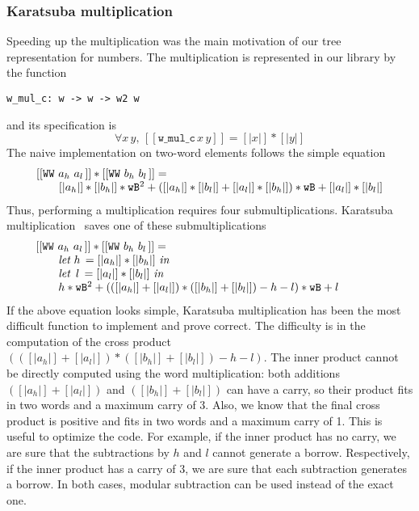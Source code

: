\subsubsection{Karatsuba multiplication}
Speeding up the multiplication was the main motivation of our 
tree representation for numbers. The multiplication is represented in our library
by the function
\begin{verbatim}
w_mul_c: w -> w -> w2 w
\end{verbatim}
and its specification is
$$\forall x\, y,\, [[\texttt{w\_mul\_c}\, x\, y]] = [|x|] * [|y|]$$
The naive implementation on two-word elements follows the simple equation
$$\begin{array}{l}
[[\texttt{WW}\,\,a_h\,\,a_l\,]] * [[\texttt{WW}\,\,b_h\,\,b_l\,]] =\\
\hskip20pt [|{a_h}|] * [|{b_h}|] * {\texttt{wB}} ^ 2 +  ([|{a_h}|] * [|{b_l}|] + [|{a_l}|] * [|{b_h}|]) * {\texttt{wB}} + [|{a_l}|] * [|{b_l}|]
\end{array}
$$
Thus, performing a multiplication requires four submultiplications.
Karatsuba multiplication~\cite{Karat} saves one of these submultiplications
$$\begin{array}{l}
[[\texttt{WW}\,\,a_h\,\,a_l\,]] * [[\texttt{WW}\,\,b_h\,\,b_l\,]] = \\
\hskip20pt \textit{let}\,\, {h}\, = [|{a_h}|] * [|{b_h}|]\,\, \textit{in}\\
\hskip20pt \textit{let}\,\,\,  {l}\, = [|{a_l}|] * [|{b_l}|]\,\, \textit{in}\\
\hskip20pt {h} * {\texttt{wB}}^2 + (([|{a_h}|] + [|{a_l}|]) * ([|{b_h}|] + [|{b_l}|]) - {h} - {l}) * {\texttt{wB}} + {l} \qquad\qquad
\end{array}
$$
If the above equation looks simple,  Karatsuba multiplication has been the most difficult function 
to implement and prove correct.
The difficulty is in the computation of the cross
product $(([|{a_h}|] + [|{a_l}|]) * ([|{b_h}|] + [|{b_l}|]) - {h} - {l})$. 
The inner product cannot be directly computed using the word multiplication: 
both additions $([|{a_h}|] + [|{a_l}|])$ and $([|{b_h}|] + [|{b_l}|])$ can have a carry, 
so their product fits in two words and a maximum carry of 3.
Also, we know that the final cross product is positive and fits in
two words and a maximum carry of 1. This is useful to optimize the code.
For example, 
if the inner product has no carry, we are sure that the subtractions 
by $h$ and $l$ cannot generate a borrow. Respectively, 
if the inner product has a carry of 3,  we are sure that each 
subtraction generates a borrow. In both cases, modular subtraction can 
be used instead of the exact one. 

